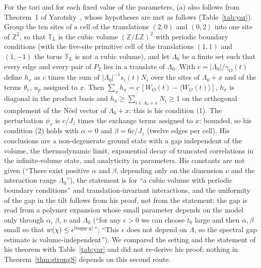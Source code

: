 \documentclass[aps,prx,onecolumn,10pt,nofootinbib,longbibliography,floatfix]{revtex4-2}
\theoremstyle{remark}
\newcommand{\Jz}{J_z}
\begin{document}
For the tori and for each fixed value of the parameters, (a) also follows from Theorem~1 of %
Yarotsky~\cite{yarotsky2006}, whose hypotheses are met as follows (Table~\ref{tab:yar}). Group the ten sites of a
cell of the translations $(2,0)$ and $(0,2)$ into one site of $\mathbb Z^2$, so that $\mathbb T_L$ is the cubic
volume $(\mathbb Z/L\mathbb Z)^2$ with periodic boundary conditions (with the five-site primitive cell of the
translations $(1,1)$ and $(1,-1)$ the torus $\mathbb T_L$ is not a cubic volume), and let $\Lambda_0$ be a finite set such that every edge and every pair of
$P_2$ lies in a translate of $\Lambda_0$. With $c=|\Lambda_0|/\gamma_O(t)$ define $h_x$ as $c$ times the sum of
$|\Lambda_0|^{-1}s_i(t)N_i$ over the sites of $\Lambda_0+x$ and of the terms $\theta_e$, $u_p$ assigned to $x$. Then
$\sum_xh_x=c\,[W_O(t)-\langle W_O(t)\rangle]$, $h_x$ is diagonal in the product basis and
$h_x\ge\sum_{i\in\Lambda_0+x}N_i\ge1$ on the orthogonal complement of the N\'eel vector of $\Lambda_0+x$: this is his
condition (1). The perturbation $\phi_x$ is $c/\Jz$ times the exchange terms assigned to $x$: bounded, so his %
condition (2) holds with $\alpha=0$ and $\beta=6c/\Jz$ (twelve edges per cell). His conclusions are a %
non-degenerate ground state with a gap independent of the volume, the thermodynamic limit, exponential decay of
truncated correlations in the infinite-volume state, and analyticity in parameters. His constants are not given
(``There exist positive $\alpha$ and $\beta$, depending only on the dimension $\nu$ and the interaction range
$\Lambda_0$''), the statement is for ``a cubic volume with periodic boundary conditions'' and translation-invariant
interactions, and the uniformity of the gap in the tilt follows from his proof, not from the statement: the gap is
read from a polymer expansion whose small parameter depends on the model only through $\alpha$, $\beta$, $\nu$ and $\Lambda_0$ (``for any %
$\epsilon>0$ we can choose $t_0$ large and then $\alpha,\beta$ small so that $w(\chi)\le\epsilon^{|{\rm supp}\,\chi|}$''; %
``This $\epsilon$ does not depend on $\Lambda$, so the spectral gap estimate is volume-independent''). We compared the setting
and the statement of his theorem with Table~\ref{tab:yar} and did not re-derive his proof; nothing in
Theorem~\ref{thm:strongS} depends on this second route.
\end{document}
